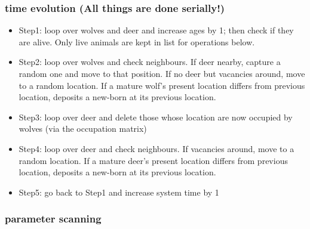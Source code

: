 \documentclass{beamer}
\begin{document}
\frame
{
  \frametitle{time evolution (All things are done serially!)}
  \begin{itemize}
  \item<1->{Step1: loop over wolves and deer and increase ages by 1; then check if they are alive. Only live animals are kept in list for operations below.}
  \item<2->{Step2: loop over wolves and check neighbours. If deer nearby, capture a random one and move to that position. If no deer but vacancies around, move to a random location. If a mature wolf's present location differs from previous location, deposits a new-born at its previous location.} 
  \item<3->{Step3: loop over deer and delete those whose location are now occupied by wolves (via the occupation matrix)}
  \item<4->{Step4: loop over deer and check neighbours. If vacancies around, move to a random location. If a mature deer's present location differs from previous location, deposits a new-born at its previous location.} 
  \item<5->{Step5: go back to Step1 and increase system time by 1}
  \end{itemize} 
  
}

\frame
{
  \frametitle{parameter scanning}
  
}
\end{document}
